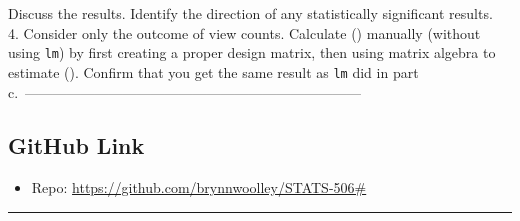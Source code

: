 \documentclass[
  letterpaper,
  DIV=11,
  numbers=noendperiod]{scrartcl}
\providecommand{\tightlist}{%
  \setlength{\itemsep}{0pt}\setlength{\parskip}{0pt}}
\begin{document}
Discuss the results. Identify the direction of any statistically
significant results.\\
4. Consider only the outcome of view counts. Calculate (\hat{\beta})
manually (without using \texttt{lm}) by first creating a proper design
matrix, then using matrix algebra to estimate (\beta). Confirm that you
get the same result as \texttt{lm} did in part
c.~------------------------------------------------------------------------

\subsection{GitHub Link}\label{github-link}

\begin{itemize}
\tightlist
\item
  Repo: \url{https://github.com/brynnwoolley/STATS-506\#}
\end{itemize}

\begin{center}\rule{0.5\linewidth}{0.5pt}\end{center}
\end{document}
